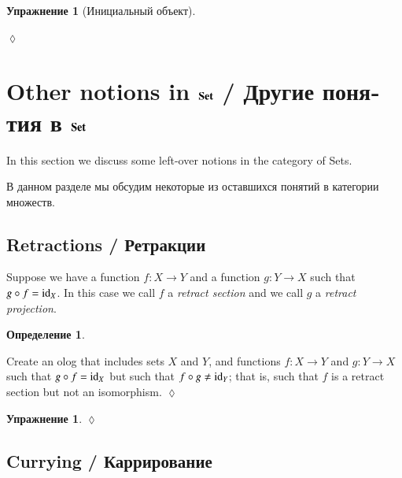 \documentclass[a4paper]{book}
\def\tn{\textnormal}
\def\to{\rightarrow}
\def\taking{\colon}
\def\id{\tn{id}}
\def\Set{{\bf Set}}
\theoremstyle{myth}
\newtheorem{excENG}[envENG]{\begin{english}Exercise\end{english}}
\newtheorem{definitionENG}[envENG]{\begin{english}Definition\end{english}}
\newenvironment{exerciseENG}{\begin{excENG}}{\hspace*{\fill}$\lozenge$\end{excENG}}
\newtheorem{excRUS}[envRUS]{Упражнение}
\newtheorem{definitionRUS}[envRUS]{Определение}
\newenvironment{exerciseRUS}{\begin{excRUS}}{\hspace*{\fill}$\lozenge$\end{excRUS}}
\begin{document}
\begin{russian}
\begin{exerciseRUS}[Инициальный объект]\label{exc:initial set}
 
\end{exerciseRUS}


\section{Other notions in $\Set$ / Другие понятия в $\Set$}

In this section we discuss some left-over notions in the category of Sets.

В данном разделе мы обсудим некоторые из оставшихся понятий в категории множеств. 


\subsection{Retractions / Ретракции}

\begin{definitionENG}
Suppose we have a function $f\taking X\to Y$ and a function $g\taking Y\to X$ such that $g\circ f=\id_X$. In this case we call $f$ a {\em retract section} and we call $g$ a {\em retract projection}. 
\end{definitionENG}

\begin{definitionRUS}
 
\end{definitionRUS}

\begin{exerciseENG}
Create an olog that includes sets $X$ and $Y$, and functions $f\taking X\to Y$ and $g\taking Y\to X$ such that $g\circ f=\id_X$ but such that $f\circ g\neq\id_Y$; that is, such that $f$ is a retract section but not an isomorphism.
\end{exerciseENG}

\begin{exerciseRUS}
 
\end{exerciseRUS}


\subsection{Currying / Каррирование}\label{sec:currying}


\end{russian}
\end{document}
